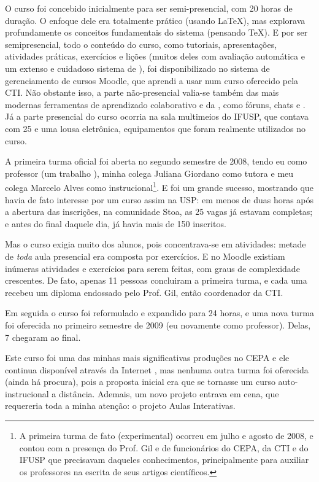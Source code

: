 O curso foi concebido inicialmente para ser semi-presencial, com 20 horas de duração. O enfoque dele era totalmente prático (usando \LaTeX), mas explorava profundamente os conceitos fundamentais do sistema (pensando \TeX). E por ser semipresencial, todo o conteúdo do curso, como tutoriais, apresentações, atividades práticas, exercícios e lições (muitos deles com avaliação automática e um extenso e cuidadoso sistema de ), foi disponibilizado no sistema de gerenciamento de cursos Moodle, que aprendi a usar num curso oferecido pela CTI. Não obstante isso, a parte não-presencial valia-se também das mais modernas ferramentas de aprendizado colaborativo e da , como fóruns, chats e . Já a parte presencial do curso ocorria na sala multimeios do IFUSP, que contava com 25  e uma lousa eletrônica, equipamentos que foram realmente utilizados no curso.

A primeira turma oficial foi aberta no segundo semestre de 2008, tendo eu como professor (um trabalho ), minha colega Juliana Giordano como tutora e meu colega Marcelo Alves como  instrucional\footnote{A primeira turma de fato (experimental) ocorreu em julho e agosto de 2008, e contou com a presença do Prof. Gil e de funcionários do CEPA, da CTI e do IFUSP que precisavam daqueles conhecimentos, principalmente para auxiliar os professores na escrita de seus artigos científicos.}. E foi um grande sucesso, mostrando que havia de fato interesse por um curso assim na USP: em menos de duas horas após a abertura das inscrições, na comunidade Stoa, as 25 vagas já estavam completas; e antes do final daquele dia, já havia mais de 150 inscritos.

Mas o curso exigia muito dos alunos, pois concentrava-se em atividades: metade de \emph{toda} aula presencial era composta por exercícios. E no Moodle existiam inúmeras atividades e exercícios para serem feitas, com graus de complexidade crescentes. De fato, apenas 11 pessoas concluiram a primeira turma, e cada uma recebeu um diploma endossado pelo Prof. Gil, então coordenador da CTI.

Em seguida o curso foi reformulado e expandido para 24 horas, e uma nova turma foi oferecida no primeiro semestre de 2009 (eu novamente como professor). Delas, 7 chegaram ao final.

Este curso foi uma das minhas mais significativas produções no CEPA e ele continua disponível através da Internet \cite{curso-LaTeX}, mas nenhuma outra turma foi oferecida (ainda há procura), pois a proposta inicial era que se tornasse um curso auto-instrucional a distância. Ademais, um novo projeto entrava em cena, que requereria toda a minha atenção: o projeto Aulas Interativas.

